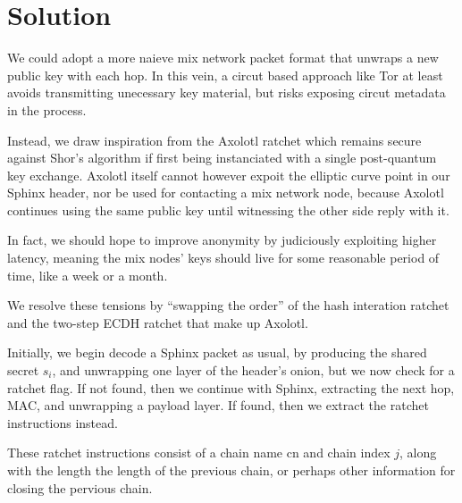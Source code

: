 \documentclass[twoside,letterpaper]{sig-alternate}
\begin{document}
\section{Solution}

We could adopt a more naieve mix network packet format that unwraps
a new public key with each hop.  In this vein, a circut based approach
like Tor at least avoids transmitting unecessary key material, but
risks exposing circut metadata in the process. 

Instead, we draw inspiration from the Axolotl ratchet %
which remains secure against Shor's algorithm if first being instanciated
with a single post-quantum key exchange. 
%
Axolotl itself cannot however expoit the elliptic curve point in
 our Sphinx header, nor be used for contacting a mix network node, 
because Axolotl continues using the same public key until witnessing
 the other side reply with it.

In fact, we should hope to improve anonymity by judiciously exploiting
higher latency, meaning the mix nodes' keys should live for some
reasonable period of time, like a week or a month.

We resolve these tensions by ``swapping the order'' of the hash interation
ratchet and the two-step ECDH ratchet that make up Axolotl.

\smallskip

Initially, we begin decode a Sphinx packet as usual,
by producing the shared secret $s_i$, and 
unwrapping one layer of the header's onion,
but we now check for a ratchet flag.
If not found, then we continue with Sphinx,
 extracting the next hop, MAC, and unwrapping a payload layer.
If found, then we extract the ratchet instructions instead.

\def\cn{\textrm{cn}}
\def\ck{\textrm{ck}}
\def\DH{\textrm{DH}}
\def\lk{\textrm{lk}}
\def\mk{\textrm{mk}}
\def\sk{\textrm{sk}}
\def\ECDH{\textrm{ECDH}}

These ratchet instructions consist of
 a chain name $\cn$ and chain index $j$,
along with the length the length of the previous chain, or
 perhaps other information for closing the pervious chain.  
\end{document}
